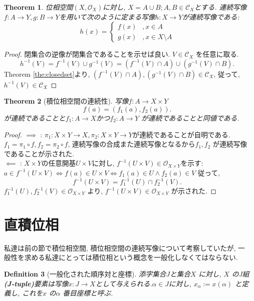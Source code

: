 \documentclass[lualatex]{ltjsbook}
\newtheorem{theorem}{Theorem}[chapter]
\newtheorem{definition}[theorem]{Definition}
\theoremstyle{remark}
\theoremstyle{plain}
\begin{document}
\begin{theorem}
\label{thm:paste}
	位相空間$(X, \mathcal{O}_X)$に対し, $X=A \cup B; A, B \in \mathcal{C}_X$とする. 連続写像$f:A\to Y, g:B\to Y$を用いて次のように定まる写像$h :X\to Y $が連続写像である:
	\[
	h\left( x\right) =
	\begin{cases}
		f(x) &, x \in A\\
		g(x) &, x \in X\setminus A
	\end{cases}
	\] 
\end{theorem}

\begin{proof}
	閉集合の逆像が閉集合であることを示せば良い.
	$V\in \mathcal{C}_X$ を任意に取る.
	\[
	h^{-1}(V) =f^{-1}(V) \cup g^{-1}(V) = \left( f^{-1}(V) \cap A \right) \cup \left( g^{-1}(V) \cap B \right) 
	.\] 
	Theorem \ref{the:closedset}より,  $\left( f^{-1}(V) \cap A \right), \left( g^{-1}(V) \cap B \right) \in \mathcal{C}_X $, 従って, $h^{-1}(V) \in \mathcal{C}_X$
\end{proof}

\begin{theorem}[積位相空間の連続性]
	写像$f:A \to X\times Y$\[
	f(a)=\left( f_1(a), f_2(a) \right) 
	.\] 	
	が連続であることと$f_1 : A\to X$かつ$f_2 : A \to Y$ が連続であることと同値である.
\end{theorem}

\begin{proof}
	$\implies$ : $\pi_1 : X\times Y \to X, \pi_2 : X\times Y \to Y$が連続であることが自明である. $f_1=\pi_1 \circ f,  f_2=\pi_2 \circ f $, 連続写像の合成また連続写像となるから$f_1, f_2$ が連続写像であることが示された.\\
	$\impliedby$ : $X\times Y$の任意開基$U\times V$に対し,  $f^{-1}\left( U\times V \right) \in \mathcal{O}_{X\times Y}$を示す: $a \in f^{-1}(U\times V) \iff f(a) \in U\times V \iff f_1(a) \in U \land f_2(a) \in V$
	従って, 
	\[
	f^{-1}(U\times V) = f_1^{-1}(U) \cap f_2^{-1}(V)
	.\] 
	$f_1^{-1}(U), f_2^{-1}(V) \in \mathcal{O}_{X\times Y}$ より, $f^{-1}(U\times V) \in \mathcal{O}_{X\times Y}$ が示された.
\end{proof}

\section{直積位相}%
\label{sec:直積位相}
私達は前の節で積位相空間,  積位相空間の連続写像について考察していたが,  一般性を求める私達にとっては積位相という概念を一般化しなくてはならない.

\begin{definition}[一般化された順序対と座標]
	添字集合$J$と集合$X$ に対し,  $X$ のJ組 \textbf{(J-tuple)}要素は写像$x:J\to X$として与えられる.$\alpha \in J$に対し,  $x_{\alpha}:=x\left( \alpha \right) $ と定義し, これを$x$ の$\alpha$ 番目座標と呼ぶ.
\end{definition}
\end{document}
